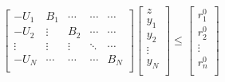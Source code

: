 \documentclass[11pt]{article} %
\begin{document}
\begin{align}  
    \begin{bmatrix}
        -U_{1} & B_{1} & \cdots & \cdots & \cdots\\
        -U_{2} &\vdots  & B_{2} & \cdots & \cdots\\
         \vdots  & \vdots  & \vdots & \ddots  & \cdots\\
        -U_{N} & \cdots  & \cdots & \cdots & B_{N}\\
    \end{bmatrix}
    \begin{bmatrix}
        z\\
        y_1\\
        y_2\\
        \vdots \\
        y_N\\
    \end{bmatrix} \leq
    \begin{bmatrix}
        r_{1}^0\\
        r_{2}^0\\
        \vdots \\
        r_{n}^0\\
    \end{bmatrix}
\end{align}
\end{document}
